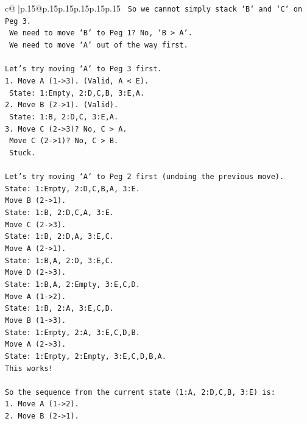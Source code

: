 \documentclass{article}
\begin{document}
{\begin{supertabular}{c@{$\;$}|p{.15\linewidth}@{}p{.15\linewidth}p{.15\linewidth}p{.15\linewidth}p{.15\linewidth}p{.15\linewidth}}
{{{\texttt{   So we cannot simply stack `B` and `C` on Peg 3.} \\
\texttt{   We need to move `B` to Peg 1? No, `B > A`.} \\
\texttt{   We need to move `A` out of the way first.} \\
\\ 
\texttt{Let's try moving `A` to Peg 3 first.} \\
\texttt{1. Move A (1{-}>3). (Valid, A < E).} \\
\texttt{   State: 1:Empty, 2:D,C,B, 3:E,A.} \\
\texttt{2. Move B (2{-}>1). (Valid).} \\
\texttt{   State: 1:B, 2:D,C, 3:E,A.} \\
\texttt{3. Move C (2{-}>3)? No, C > A.} \\
\texttt{   Move C (2{-}>1)? No, C > B.} \\
\texttt{   Stuck.} \\
\\ 
\texttt{Let's try moving `A` to Peg 2 first (undoing the previous move).} \\
\texttt{State: 1:Empty, 2:D,C,B,A, 3:E.} \\
\texttt{Move B (2{-}>1).} \\
\texttt{State: 1:B, 2:D,C,A, 3:E.} \\
\texttt{Move C (2{-}>3).} \\
\texttt{State: 1:B, 2:D,A, 3:E,C.} \\
\texttt{Move A (2{-}>1).} \\
\texttt{State: 1:B,A, 2:D, 3:E,C.} \\
\texttt{Move D (2{-}>3).} \\
\texttt{State: 1:B,A, 2:Empty, 3:E,C,D.} \\
\texttt{Move A (1{-}>2).} \\
\texttt{State: 1:B, 2:A, 3:E,C,D.} \\
\texttt{Move B (1{-}>3).} \\
\texttt{State: 1:Empty, 2:A, 3:E,C,D,B.} \\
\texttt{Move A (2{-}>3).} \\
\texttt{State: 1:Empty, 2:Empty, 3:E,C,D,B,A.} \\
\texttt{This works!} \\
\\ 
\texttt{So the sequence from the current state (1:A, 2:D,C,B, 3:E) is:} \\
\texttt{1. Move A (1{-}>2).} \\
\texttt{2. Move B (2{-}>1).} \\
}}}
\end{supertabular}}
\end{document}
